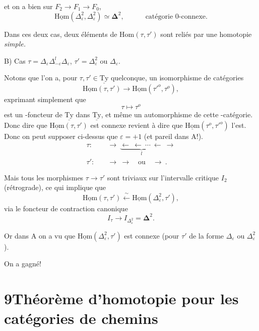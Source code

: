 \documentclass[11pt]{article}
\newcommand{\printedpage}[1]{\marginpar{\footnotesize p.~#1}}
\newcommand{\msp}[1]{\marginpar{\vspace*{10pt}\footnotesize [#1]}}
\newcommand{\uTy}{\underline{\mathrm{Ty}}}
\newcommand{\uHom}{\underline{\mathrm{Hom}}}
\begin{document}
et on a bien sur $F_2\longrightarrow F_1\longrightarrow F_0$, %
\[
\uHom(\Delta^2_\varepsilon,\Delta^2_\varepsilon)\simeq\boldsymbol{\Delta}^2,\qquad\quad\text{catégorie 0-connexe.}
\]

Dans ces deux cas, deux éléments de $\mathrm{Hom}(\tau,\tau')$ sont reliés par une homotopie \textit{simple.}

\msp{page 93}

B) Cas $\tau=\Delta_\varepsilon\Delta^l_{-\varepsilon}\Delta_\varepsilon$, $\tau'=\Delta^2_\varepsilon$ ou $\Delta_\varepsilon$.

Notons que l'on a, pour $\tau,\tau'\in\uTy$ quelconque, un isomorphisme de catégories
\[
\uHom(\tau,\tau')\longrightarrow\uHom(\tau'^o,\tau^o),
\]
exprimant simplement que
\[
\tau\longmapsto\tau^o
\]
est un -foncteur de $\uTy$ dans $\uTy$, et même un automorphisme de cette -catégorie. Donc dire que $\uHom(\tau,\tau')$ est connexe revient à dire que $\uHom(\tau^o,\tau'^o)$ l'est. Donc on peut supposer ci-dessus que $\varepsilon=+1$ (et pareil dans A!).
\[
\begin{aligned}
\tau :\quad & \longrightarrow\ \underbrace{\longleftarrow\ \longleftarrow\ \cdots\ \longleftarrow}_{l}\ \longrightarrow\\
\tau' :\quad & \longrightarrow\ \longrightarrow\quad\text{ou}\quad\longrightarrow\ .
\end{aligned}
\]

Mais tous les morphismes $\tau\longrightarrow\tau'$ sont triviaux sur l'intervalle critique $I_2$ (rétrograde), ce qui implique que
\[
\uHom(\tau,\tau')\xleftarrow{\ \sim\ }\uHom(\Delta^2_\varepsilon,\tau'),
\]
via le foncteur de contraction canonique
\[
I_\tau\longrightarrow I_{\Delta^2_\varepsilon}=\boldsymbol{\Delta}^2.
\]

Or dans A on a vu que $\uHom(\Delta^2_\varepsilon,\tau')$ est connexe (pour $\tau'$ de la forme $\Delta_\varepsilon$ ou $\Delta^2_\varepsilon$).

On a gagné!

\newpage
\printedpage{60}

\msp{page 94}

\section*{9\quad Théorème d'homotopie pour les catégories de chemins}
\end{document}
